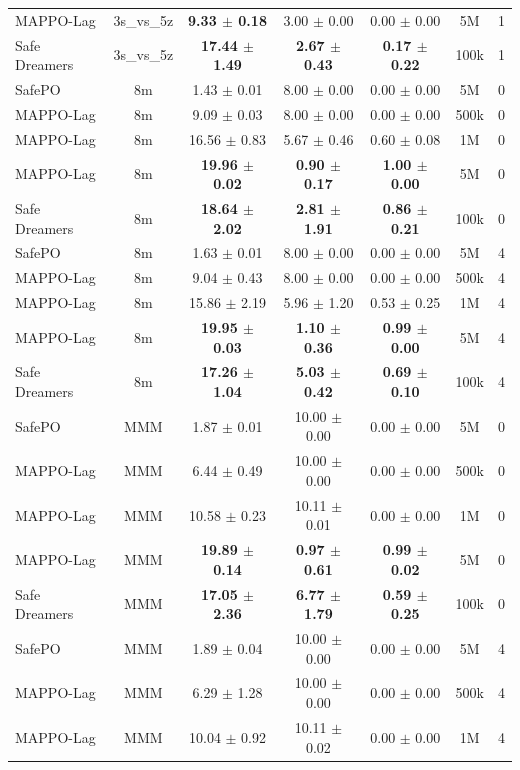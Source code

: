 \documentclass{article}
\begin{document}
\begin{longtable}{lcccccc}
MAPPO-Lag & 3s\_vs\_5z & \textbf{9.33 $\pm$ 0.18} & 3.00 $\pm$ 0.00 & 0.00 $\pm$ 0.00 & 5M & 1 \\
Safe Dreamers & 3s\_vs\_5z & \textbf{17.44 $\pm$ 1.49} & \textbf{2.67 $\pm$ 0.43} & \textbf{0.17 $\pm$ 0.22} & 100k & 1 \\
\midrule
SafePO & 8m & 1.43 $\pm$ 0.01 & 8.00 $\pm$ 0.00 & 0.00 $\pm$ 0.00 & 5M & 0 \\
MAPPO-Lag & 8m & 9.09 $\pm$ 0.03 & 8.00 $\pm$ 0.00 & 0.00 $\pm$ 0.00 & 500k & 0 \\
MAPPO-Lag & 8m & 16.56 $\pm$ 0.83 & 5.67 $\pm$ 0.46 & 0.60 $\pm$ 0.08 & 1M & 0 \\
MAPPO-Lag & 8m & \textbf{19.96 $\pm$ 0.02} & \textbf{0.90 $\pm$ 0.17} & \textbf{1.00 $\pm$ 0.00} & 5M & 0 \\
Safe Dreamers & 8m & \textbf{18.64 $\pm$ 2.02} & \textbf{2.81 $\pm$ 1.91} & \textbf{0.86 $\pm$ 0.21} & 100k & 0 \\
\midrule
SafePO & 8m & 1.63 $\pm$ 0.01 & 8.00 $\pm$ 0.00 & 0.00 $\pm$ 0.00 & 5M & 4 \\
MAPPO-Lag & 8m & 9.04 $\pm$ 0.43 & 8.00 $\pm$ 0.00 & 0.00 $\pm$ 0.00 & 500k & 4 \\
MAPPO-Lag & 8m & 15.86 $\pm$ 2.19 & 5.96 $\pm$ 1.20 & 0.53 $\pm$ 0.25 & 1M & 4 \\
MAPPO-Lag & 8m & \textbf{19.95 $\pm$ 0.03} & \textbf{1.10 $\pm$ 0.36} & \textbf{0.99 $\pm$ 0.00} & 5M & 4 \\
Safe Dreamers & 8m & \textbf{17.26 $\pm$ 1.04} & \textbf{5.03 $\pm$ 0.42} & \textbf{0.69 $\pm$ 0.10} & 100k & 4 \\
\midrule
SafePO & MMM & 1.87 $\pm$ 0.01 & 10.00 $\pm$ 0.00 & 0.00 $\pm$ 0.00 & 5M & 0 \\
MAPPO-Lag & MMM & 6.44 $\pm$ 0.49 & 10.00 $\pm$ 0.00 & 0.00 $\pm$ 0.00 & 500k & 0 \\
MAPPO-Lag & MMM & 10.58 $\pm$ 0.23 & 10.11 $\pm$ 0.01 & 0.00 $\pm$ 0.00 & 1M & 0 \\
MAPPO-Lag & MMM & \textbf{19.89 $\pm$ 0.14} & \textbf{0.97 $\pm$ 0.61} & \textbf{0.99 $\pm$ 0.02} & 5M & 0 \\
Safe Dreamers & MMM & \textbf{17.05 $\pm$ 2.36} & \textbf{6.77 $\pm$ 1.79} & \textbf{0.59 $\pm$ 0.25} & 100k & 0 \\
\midrule
SafePO & MMM & 1.89 $\pm$ 0.04 & 10.00 $\pm$ 0.00 & 0.00 $\pm$ 0.00 & 5M & 4 \\
MAPPO-Lag & MMM & 6.29 $\pm$ 1.28 & 10.00 $\pm$ 0.00 & 0.00 $\pm$ 0.00 & 500k & 4 \\
MAPPO-Lag & MMM & 10.04 $\pm$ 0.92 & 10.11 $\pm$ 0.02 & 0.00 $\pm$ 0.00 & 1M & 4 \\

\end{longtable}
\end{document}

